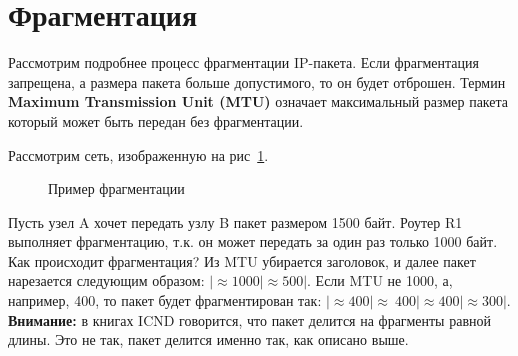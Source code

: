 \label{sec:fragmentation}
\section{Фрагментация}
Рассмотрим подробнее процесс фрагментации IP-пакета. Если фрагментация запрещена, а размера пакета больше допустимого, то он будет отброшен. Термин \textbf{Maximum Transmission Unit (MTU)} означает максимальный размер пакета который может быть передан без фрагментации. 
\begin{exmp}
Рассмотрим сеть, изображенную на рис~\ref{fig:ip_fragmentationexample}.
\begin{figure}[h!]
	\centering
	\caption{Пример фрагментации}
	\label{fig:ip_fragmentationexample}
\end{figure}

Пусть узел A хочет передать узлу B пакет размером 1500 байт. Роутер R1 выполняет фрагментацию, т.к. он может передать за один раз только 1000 байт. Как происходит фрагментация? Из MTU убирается заголовок, и далее пакет нарезается следующим образом: $|\approx1000|\approx500|$. Если MTU не 1000, а, например, 400, то пакет будет фрагментирован так: $|\approx400|\approx~400|\approx400|\approx300|$. \textbf{Внимание: } в книгах ICND говорится, что пакет делится на фрагменты равной длины. Это не так, пакет делится именно так, как описано выше.
\end{exmp}

